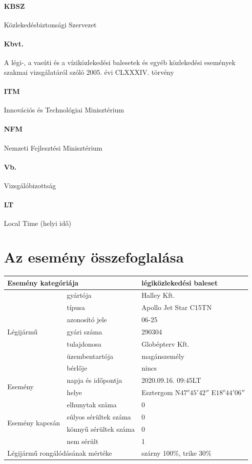 \documentclass[a4paper,10pt]{article}
\begin{document}
\paragraph*{KBSZ} Közlekedésbiztonsági Szervezet
\paragraph*{Kbvt.} A légi-, a vasúti és a víziközlekedési balesetek és
egyéb közlekedési események szakmai vizsgálatáról szóló 2005. évi CLXXXIV. 
törvény
\paragraph*{ITM} Innovációs és Technológiai Minisztérium
\paragraph*{NFM} Nemzeti Fejlesztési Minisztérium
\paragraph*{Vb.} Vizsgálóbizottság
\paragraph*{LT} Local Time (helyi idő)
\pagebreak

\section*{Az esemény összefoglalása}
\begin{tabular}{|l|l|l|}
\hline
\multicolumn{2}{|l|}{Esemény kategóriája} & légiközlekedési baleset\\ \hline
\multirow{7}{3cm}{Légijármű}
    & gyártója & Halley Kft.\\ \cline{2-3}
    & típusa & Apollo Jet Star C15TN\\ \cline{2-3}
    & azonosító jele & 06-25\\ \cline{2-3}
    & gyári száma & 290304\\ \cline{2-3}
    & tulajdonosa & Globépterv Kft.\\ \cline{2-3}
    & üzembentartója & magánszemély\\ \cline{2-3}
    & bérlője & nincs\\ \cline{2-3}
\hline
\multirow{2}{3cm}{Esemény}
    & napja és időpontja & 2020.09.16. 09:45LT\\ \cline{2-3}
    & helye & Esztergom N$47^o 45' 42''$ E$18^o 44' 06''$\\ \cline{2-3}
\hline
\multirow{4}{3cm}{Esemény kapcsán}
    & elhunytak száma & 0\\ \cline{2-3}
    & súlyos sérültek száma & 0\\ \cline{2-3}
    & könnyű sérültek száma & 0\\ \cline{2-3}
    & nem sérült & 1\\ \cline{2-3}
\hline
\multicolumn{2}{|l|}{Légijármű rongálódásának mértéke} & szárny 100\%, 
trike 30\%\\ \hline
\end{tabular}
\end{document}

